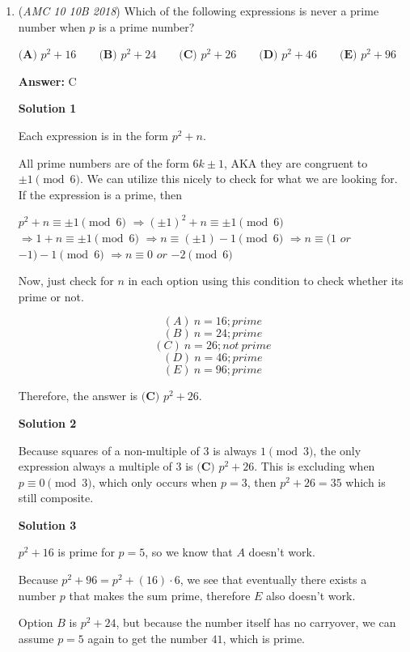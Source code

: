 \begin{enumerate}
	\item (\textit{AMC 10 10B 2018}) Which of the following expressions is never a prime number when $p$ is a prime number?


 $\textbf{(A) }p^2+16 \qquad \textbf{(B) }p^2+24 \qquad \textbf{(C) }p^2+26 \qquad \textbf{(D) }p^2+46 \qquad \textbf{(E) }p^2+96 \qquad$

 \textbf{Answer: }C



\textbf{Solution 1}

Each expression is in the form $p^2 + n$.

 All prime numbers are of the form $6k \pm 1$, AKA they are congruent to $\pm1 \pmod{6}$. We can utilize this nicely to check for what we are looking for. If the expression is a prime, then

 
$p^2 + n \equiv \pm1 \pmod{6}$
$\Rightarrow (\pm1)^2 + n \equiv \pm1 \pmod{6}$
$\Rightarrow 1 + n \equiv \pm1 \pmod{6}$
$\Rightarrow n \equiv (\pm1) - 1 \pmod{6}$
$\Rightarrow n \equiv (1$ $or$ $-1) - 1 \pmod{6}$
$\Rightarrow n \equiv 0$ $or$ $-2 \pmod{6}$

 
Now, just check for $n$ in each option using this condition to check whether its prime or not.

 
 \[(A)\ n = 16; prime\]
 \[(B)\ n = 24; prime\]
 \[(C)\ n = 26; not\ prime\]
 \[(D)\ n = 46; prime\]
 \[(E)\ n = 96; prime\]

 Therefore, the answer is $\boxed{\textbf{(C) } p^2 + 26}$.

 


 



\textbf{Solution 2}

Because squares of a non-multiple of 3 is always $1 \pmod{3}$, the only expression always a multiple of $3$ is $\boxed{\textbf{(C) } p^2+26}$. This is excluding when $p\equiv 0 \pmod{3}$, which only occurs when $p=3$, then $p^2+26=35$ which is still composite.

 



\textbf{Solution 3}

\( p^2 + 16 \) is prime for \( p = 5 \), so we know that \( A \) doesn't work.

 Because \( p^2 + 96 = p^2 + (16) \cdot 6 \), we see that eventually there exists a number \( p \) that makes the sum prime, therefore \( E \) also doesn't work.

 Option \( B \) is \( p^2 + 24 \), but because the number itself has no carryover, we can assume \( p = 5 \) again to get the number \( 41 \), which is prime.


\end{enumerate}
